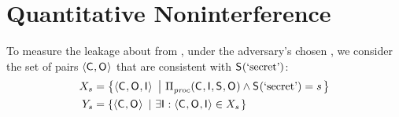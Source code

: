 \section{Quantitative Noninterference}
\label{sscf:sec:measurement}
To measure the leakage
about \secretVar from \AOOFn{}, under the adversary's chosen \ACIFn{},
we consider the set \possibleDoubles{\secretVal} of pairs $\langle
\mathsf{C}_{}, \mathsf{O}_{}\rangle$ that are consistent with
$\mathsf{S}_{}(\textrm{`secret'})$:
\begin{align*}
  X_{s} & = \left\{\langle\mathsf{C}_{}, \mathsf{O}_{},
  \mathsf{I}_{}\rangle ~\left|~ \Pi_{\mathit{proc}}^{}(\mathsf{C}_{}, 
  \mathsf{I}_{}, \mathsf{S}_{}, \mathsf{O}_{}) \wedge \mathsf{S}_{}(\textrm{`secret'}) = s\right.\right\} \\
Y_{s} & = \left\{\langle\mathsf{C}_{}, \mathsf{O}_{}\rangle
~\left|~ \exists \mathsf{I}_{}: \langle\mathsf{C}_{}, \mathsf{O}_{},
  \mathsf{I}_{}\rangle \in X_{s} \right.\right\}
\end{align*}

